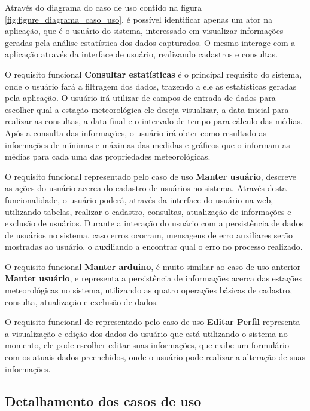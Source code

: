 Através do diagrama do caso de uso contido na figura \ref{fig:figure_diagrama_caso_uso}, é possível identificar apenas um ator na aplicação, que é o usuário do sistema, interessado em visualizar informações geradas pela análise estatística dos dados capturados. O mesmo interage com a aplicação através da interface de usuário, realizando cadastros e consultas.

O requisito funcional \textbf{Consultar estatísticas} é o principal requisito do sistema, onde o usuário fará a filtragem dos dados, trazendo a ele as estatísticas geradas pela aplicação.
O usuário irá utilizar de campos de entrada de dados para escolher qual a estação meteorológica ele deseja visualizar, a data inicial para realizar as consultas, a data final e o intervalo de tempo para cálculo das médias.
Após a consulta das informações, o usuário irá obter como resultado as informações de mínimas e máximas das medidas e gráficos que o informam as médias para cada uma das propriedades meteorológicas.

O requisito funcional representado pelo caso de uso \textbf{Manter usuário}, descreve as ações do usuário acerca do cadastro de usuários no sistema.
Através desta funcionalidade, o usuário poderá, através da interface do usuário na web, utilizando tabelas, realizar o cadastro, consultas, atualização de informações e exclusão de usuários.
Durante a interação do usuário com a persistência de dados de usuários no sistema, caso erros ocorram, mensagens de erro auxiliares serão mostradas ao usuário, o auxiliando a encontrar qual o erro no processo realizado.

O requisito funcional \textbf{Manter arduino}, é muito similiar ao caso de uso anterior \textbf{Manter usuário}, e representa a persistência de informações acerca das estações meteorológicas no sistema, utilizando as quatro operações básicas de cadastro, consulta, atualização e exclusão de dados.

O requisito funcional de representado pelo caso de uso \textbf{Editar Perfil} representa a visualização e edição dos dados do usuário que está utilizando o sistema no momento, ele pode escolher editar suas informações, que exibe um formulário com os atuais dados preenchidos, onde o usuário pode realizar a alteração de suas informações.

\subsection{Detalhamento dos casos de uso}

